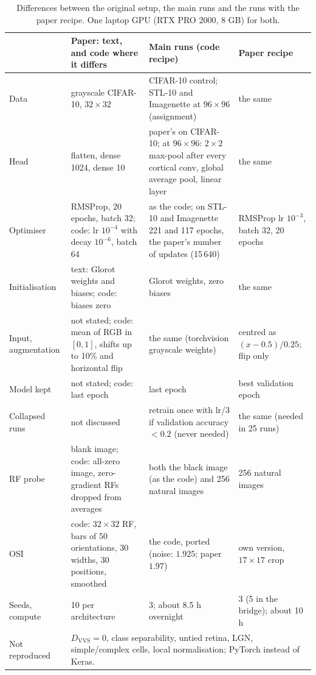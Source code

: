 \documentclass[11pt,a4paper]{article}
\newcommand{\DVVS}{D_{\mathrm{VVS}}}
\begin{document}
\begin{table}[t]
\centering\footnotesize
\begin{tabular}{p{1.9cm}p{4.4cm}p{4.5cm}p{3.6cm}}
\toprule
 & Paper: text, and code where it differs & Main runs (code recipe) & Paper recipe\\
\midrule
Data & grayscale CIFAR-10, $32{\times}32$ & CIFAR-10 control; STL-10 and Imagenette at $96{\times}96$ (assignment) & the same\\
Head & flatten, dense 1024, dense 10 & paper's on CIFAR-10; at $96{\times}96$: $2{\times}2$ max-pool after every cortical conv, global average pool, linear layer & the same\\
Optimiser & RMSProp, 20 epochs, batch 32; code: lr $10^{-4}$ with decay $10^{-6}$, batch 64 & as the code; on STL-10 and Imagenette 221 and 117 epochs, the paper's number of updates (15\,640) & RMSProp lr $10^{-3}$, batch 32, 20 epochs\\
Initialisation & text: Glorot weights and biases; code: biases zero & Glorot weights, zero biases & the same\\
Input, augmentation & not stated; code: mean of RGB in $[0,1]$, shifts up to 10\% and horizontal flip & the same (torchvision grayscale weights) & centred as $(x-0.5)/0.25$; flip only\\
Model kept & not stated; code: last epoch & last epoch & best validation epoch\\
Collapsed runs & not discussed & retrain once with lr/3 if validation accuracy $<0.2$ (never needed) & the same (needed in 25 runs)\\
RF probe & blank image; code: all-zero image, zero-gradient RFs dropped from averages & both the black image (as the code) and 256 natural images & 256 natural images\\
OSI & code: $32{\times}32$ RF, bars of 50 orientations, 30 widths, 30 positions, smoothed & the code, ported (noise: $1.925$; paper $1.97$) & own version, $17{\times}17$ crop\\
Seeds, compute & 10 per architecture & 3; about 8.5 h overnight & 3 (5 in the bridge); about 10 h\\
Not reproduced & \multicolumn{3}{p{12.5cm}}{$\DVVS=0$, class separability, untied retina, LGN, simple/complex cells, local normalisation; PyTorch instead of Keras.}\\
\bottomrule
\end{tabular}
\caption{Differences between the original setup, the main runs and the runs with the paper recipe. One laptop GPU (RTX PRO 2000, 8 GB) for both.}\label{tab:diff}
\end{table}
\end{document}
